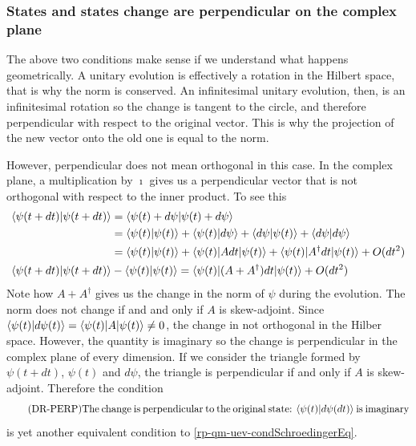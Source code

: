 \subsubsection{States and states change are perpendicular on the complex plane}
The above two conditions make sense if we understand what happens geometrically. A unitary evolution is effectively a rotation in the Hilbert space, that is why the norm is conserved. An infinitesimal unitary evolution, then, is an infinitesimal rotation so the change is tangent to the circle, and therefore perpendicular with respect to the original vector. This is why the projection of the new vector onto the old one is equal to the norm.

However, perpendicular does not mean orthogonal in this case. In the complex plane, a multiplication by $\imath$ gives us a perpendicular vector that is not orthogonal with respect to the inner product. To see this
\begin{equation}
	\begin{aligned}
		\langle\psi(t+dt) | \psi(t+dt) \rangle &= \langle\psi(t) + d\psi | \psi(t) + d\psi \rangle \\
		&= \langle\psi(t) | \psi(t) \rangle + \langle\psi(t) |  d\psi \rangle + \langle d\psi | \psi(t) \rangle + \langle d\psi |  d\psi \rangle \\
		&= \langle\psi(t) | \psi(t) \rangle + \langle\psi(t) | A dt |  \psi(t) \rangle + \langle \psi(t) | A^{\dagger} dt | \psi(t) \rangle + O(dt^2) \\
		\langle\psi(t+dt) | \psi(t+dt) \rangle &- \langle\psi(t) | \psi(t) \rangle = \langle\psi(t) | (A + A^{\dagger})dt | \psi(t) \rangle + O(dt^2)
	\end{aligned}
\end{equation}
Note how $A + A^{\dagger}$ gives us the change in the norm of $\psi$ during the evolution. The norm does not change if and and only if $A$ is skew-adjoint. Since $\langle\psi(t) |  d\psi(t) \rangle = \langle\psi(t) | A | \psi(t) \rangle \neq 0$, the change in not orthogonal in the Hilber space. However, the quantity is imaginary so the change is perpendicular in the complex plane of every dimension. If we consider the triangle formed by $\psi(t+dt)$, $\psi(t)$ and $d\psi$, the triangle is perpendicular if and only if $A$ is skew-adjoint. Therefore the condition
\begin{equation}\label{rp-qm-uev-condOrthogonalChange}
	\tag{DR-PERP}
	\eqtext{The change is perpendicular to the original state: $\< \psi(t) | d\psi(dt) \>$ is imaginary} 
\end{equation}
is yet another equivalent condition to \ref{rp-qm-uev-condSchroedingerEq}.

